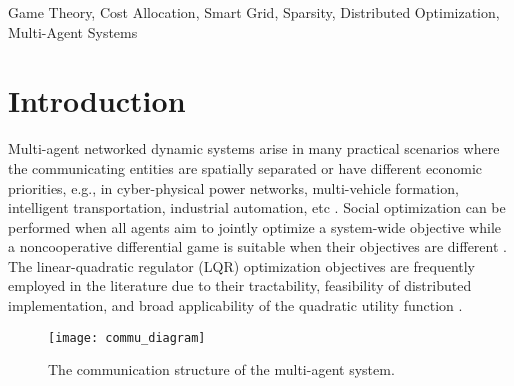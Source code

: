 \documentclass[12pt, draftclsnofoot,onecolumn]{IEEEtran}
\newcommand{\commwidth}{2.6in}
\newcommand{\commwidth}{3.2in}
\begin{document}
\begin{IEEEkeywords}
Game Theory, Cost Allocation, Smart Grid, Sparsity, Distributed Optimization, Multi-Agent Systems
\end{IEEEkeywords}


\IEEEpeerreviewmaketitle

\section{Introduction}








Multi-agent networked dynamic systems arise in many practical scenarios where the communicating entities are spatially separated or have different economic priorities, e.g., in cyber-physical power networks, multi-vehicle formation, intelligent transportation, industrial automation, etc \cite{sztipanovits2012toward}. Social optimization can be performed when all agents aim to jointly optimize a system-wide objective while a noncooperative differential game is suitable when their objectives are different \cite{basar85}. The linear-quadratic regulator (LQR) optimization objectives are frequently employed in the literature due to their tractability, feasibility of distributed implementation, and broad applicability of the quadratic utility function \cite{basar85,lewis1995optimal,LUKES197196,Mukaidani2006}.

\begin{figure}[!b]
  	\centering
  	\texttt{[image: commu\_diagram]}
  	\caption{The communication structure of the multi-agent system.}
  	\label{comm:fig}
  \end{figure}
\end{document}
